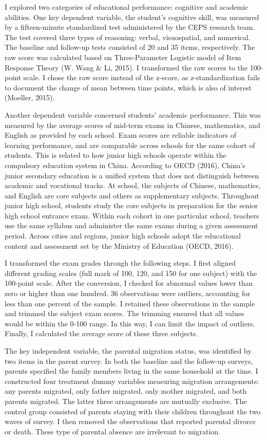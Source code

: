 \documentclass[
  man,floatsintext]{apa7}
\begin{document}
I explored two categories of educational performance: cognitive and academic abilities. One key dependent variable, the student's cognitive skill, was measured by a fifteen-minute standardized test administered by the CEPS research team. The test covered three types of reasoning: verbal, visuospatial, and numerical. The baseline and follow-up tests consisted of 20 and 35 items, respectively. The raw score was calculated based on Three-Parameter Logistic model of Item Response Theory (W. Wang \& Li, 2015). I transformed the raw scores to the 100-point scale. I chose the raw score instead of the z-score, as z-standardization fails to document the change of mean between time points, which is also of interest (Moeller, 2015).

Another dependent variable concerned students' academic performance. This was measured by the average scores of mid-term exams in Chinese, mathematics, and English as provided by each school. Exam scores are reliable indicators of learning performance, and are comparable across schools for the same cohort of students. This is related to how junior high schools operate within the compulsory education system in China. According to OECD (2016), China's junior secondary education is a unified system that does not distinguish between academic and vocational tracks. At school, the subjects of Chinese, mathematics, and English are core subjects and others as supplementary subjects. Throughout junior high school, students study the core subjects in preparation for the senior high school entrance exam. Within each cohort in one particular school, teachers use the same syllabus and administer the same exams during a given assessment period. Across cities and regions, junior high schools adopt the educational content and assessment set by the Ministry of Education (OECD, 2016).

I transformed the exam grades through the following steps. I first aligned different grading scales (full mark of 100, 120, and 150 for one subject) with the 100-point scale. After the conversion, I checked for abnormal values lower than zero or higher than one hundred. 36 observations were outliers, accounting for less than one percent of the sample. I retained these observations in the sample and trimmed the subject exam scores. The trimming ensured that all values would be within the 0-100 range. In this way, I can limit the impact of outliers. Finally, I calculated the average score of these three subjects.

The key independent variable, the parental migration status, was identified by two items in the parent survey. In both the baseline and the follow-up surveys, parents specified the family members living in the same household at the time. I constructed four treatment dummy variables measuring migration arrangements: any parents migrated, only father migrated, only mother migrated, and both parents migrated. The latter three arrangements are mutually exclusive. The control group consisted of parents staying with their children throughout the two waves of survey. I then removed the observations that reported parental divorce or death. These type of parental absence are irrelevant to migration.
\end{document}
